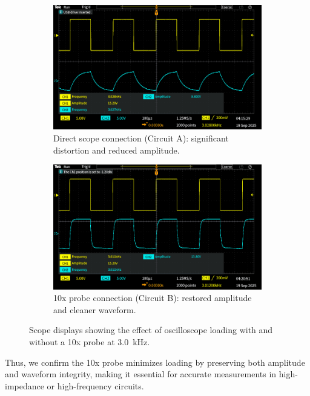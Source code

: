 \documentclass{article}
\begin{document}
\begin{figure}[H]
    \centering
    \begin{subfigure}[t]{0.48\textwidth}
        \centering
        \includegraphics[width=\linewidth]{4.1b.A.png}
        \caption{Direct scope connection (Circuit A): significant distortion and reduced amplitude.}
        \label{fig:circuit_a}
    \end{subfigure}
    \hfill
    \begin{subfigure}[t]{0.48\textwidth}
        \centering
        \includegraphics[width=\linewidth]{4.1b.B.png}
        \caption{10x probe connection (Circuit B): restored amplitude and cleaner waveform.}
        \label{fig:circuit_b}
    \end{subfigure}
    \caption{Scope displays showing the effect of oscilloscope loading with and without a 10x probe at \SI{3.0}{\kilo\hertz}.}
    \label{fig:circuits_ab}
\end{figure}

\noindent Thus, we confirm the 10x probe minimizes loading by preserving both
amplitude and waveform integrity, making it essential for accurate measurements
in high-impedance or high-frequency circuits.
\end{document}
